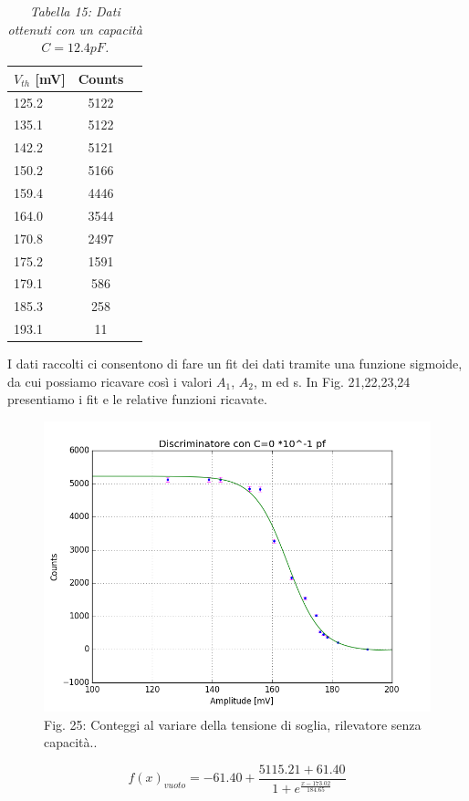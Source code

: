 \documentclass[a4paper]{article}
\begin{document}
	\begin{table}[H]
	
		\begin{tabular}{lcc}
			\hline
			\hline
			\textbf{$V_{th}$} [mV] & \textbf{Counts}  	\\
			\hline
			\hline
				      125.2 &  5122	 \\
				      135.1 &  5122	 \\
					  142.2	&  5121	\\		      
				      150.2 &  5166	 \\
				      159.4 &  4446	  \\
				      164.0 &  3544	 \\
				      170.8 &  2497	 \\
					  175.2 &  1591		\\		      
				      179.1 &  586	  \\
				      185.3 & 258  \\
				      193.1 &  11  \\
				      
			\hline
			\hline
		\end{tabular}
		\linebreak
		\caption{\textit{Tabella 15: Dati ottenuti con un capacità $C=12.4 pF$.}}\label{tab:15} 
	\end{table}	
I dati raccolti ci consentono di fare un fit dei dati tramite una funzione sigmoide, da cui possiamo ricavare così i valori $A_{1}$, $A_{2}$, m ed s. In Fig. 21,22,23,24 presentiamo i fit e le relative funzioni ricavate.

\begin{figure}[H]
\includegraphics[width=1\textwidth]{discriminatore_0C}
        \caption{Fig. 25: Conteggi al variare della tensione di soglia, rilevatore senza capacità..}
        \label{fig:25}
\end{figure}
\begin{equation}
f(x)_{vuoto}= -61.40 + \frac{5115.21+61.40}{1+e^{\frac{x-173.02}{184.65}}}
\end{equation}
\end{document}
